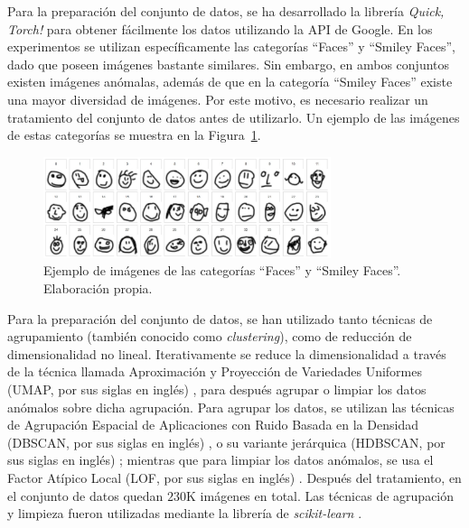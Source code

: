 Para la preparación del conjunto de datos, se ha desarrollado la librería \textit{Quick, Torch!} \cite{munoz2023quicktorch} para obtener fácilmente los datos utilizando la API de Google.
En los experimentos se utilizan específicamente las categorías ``Faces'' y ``Smiley Faces'', dado que poseen imágenes bastante similares. Sin embargo, en ambos conjuntos existen imágenes anómalas, además de que en la categoría ``Smiley Faces'' existe una mayor diversidad de imágenes. Por este motivo, es necesario realizar un tratamiento del conjunto de datos antes de utilizarlo. Un ejemplo de las imágenes de estas categorías se muestra en la Figura~\ref{fig:quick-draw-caras}.

\begin{figure}[htbp]
    \centering
    \includegraphics[width=0.75\textwidth]{img/quick-draw/caras.jpg}
    \caption{Ejemplo de imágenes de las categorías ``Faces'' y ``Smiley Faces''. Elaboración propia.}
    \label{fig:quick-draw-caras}
\end{figure}


Para la preparación del conjunto de datos, se han utilizado tanto técnicas de agrupamiento (también conocido como \textit{clustering}), como de reducción de dimensionalidad no lineal.
Iterativamente se reduce la dimensionalidad a través de la técnica llamada Aproximación y Proyección de Variedades Uniformes (UMAP, por sus siglas en inglés) \cite{mcinnes2018umap}, para después agrupar o limpiar los datos anómalos sobre dicha agrupación. Para agrupar los datos, se utilizan las técnicas de Agrupación Espacial de Aplicaciones con Ruido Basada en la Densidad (DBSCAN, por sus siglas en inglés) \cite{ester1996density}, o su variante jerárquica (HDBSCAN, por sus siglas en inglés) \cite{campello2013density};
mientras que para limpiar los datos anómalos, se usa el Factor Atípico Local (LOF, por sus siglas en inglés) \cite{breunig2000lof}. Después del tratamiento, en el conjunto de datos quedan $230$K imágenes en total. Las técnicas de agrupación y limpieza fueron utilizadas mediante la librería de \textit{scikit-learn} \cite{sklearn}.


